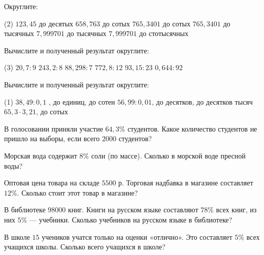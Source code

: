 \begin{class}[number=6]
	\begin{listofex}
		\item Округлите: 
		\begin{tasks}(2)
			\task \( 123,45 \) до десятых
			\task \(  658,763 \) до сотых
			\task \( 765,3401 \) до сотых
			\task \( 765,3401 \) до тысячных
			\task \( 7,999701 \) до тысячных
			\task \( 7,999701 \) до стотысячных
		\end{tasks}
		\item Вычислите и полученный результат округлите: 
		\begin{tasks}(3)
			\task \( 20,7 :9 \) 
			\task \( 243,2:8 \)
			\task \( 88,298: 7 \)
			\task \( 772,8:12 \)
			\task \( 93,15: 23 \)
			\task \( 0,644:92 \)
		\end{tasks}
		\item Вычислите и полученный результат округлите: 
		\begin{tasks}(1)
			\task \( 38,49 : 0,1 \) , до единиц, до сотен
			\task \( 56,99 : 0,01  \), до десятков, до десятков тысяч
			\task \( 65,3 \cdot3,21 \), до сотых
		\end{tasks}
		\item  В голосовании приняли участие \( 64,3\% \) студентов. Какое количество студентов не
		пришло на выборы, если всего \( 2000 \) студентов? 
		\item  Морская вода содержит \( 8\% \) соли (по массе). Сколько в морской воде пресной воды? 
		\item Оптовая цена товара на складе \( 5500 \) р. Торговая надбавка в магазине составляет \( 12\% \). 
		Сколько стоит этот товар в магазине?  
		\item В библиотеке \( 98000  \) книг. Книги на русском языке составляют \( 78\% \) всех книг, из
		них \( 5\% \) --- учебники. Сколько учебников на русском языке в библиотеке?
		\item В школе \( 15 \) учеников учатся только на оценки «отлично». Это составляет \( 5\% \) всех учащихся
		школы. Сколько всего учащихся в школе? 
	\end{listofex}
\end{class}

